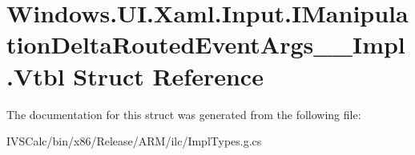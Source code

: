 \hypertarget{struct_windows_1_1_u_i_1_1_xaml_1_1_input_1_1_i_manipulation_delta_routed_event_args_____impl_1_1_vtbl}{}\section{Windows.\+U\+I.\+Xaml.\+Input.\+I\+Manipulation\+Delta\+Routed\+Event\+Args\+\_\+\+\_\+\+Impl.\+Vtbl Struct Reference}
\label{struct_windows_1_1_u_i_1_1_xaml_1_1_input_1_1_i_manipulation_delta_routed_event_args_____impl_1_1_vtbl}


The documentation for this struct was generated from the following file\+:\begin{DoxyCompactItemize}
\item 
I\+V\+S\+Calc/bin/x86/\+Release/\+A\+R\+M/ilc/Impl\+Types.\+g.\+cs\end{DoxyCompactItemize}
